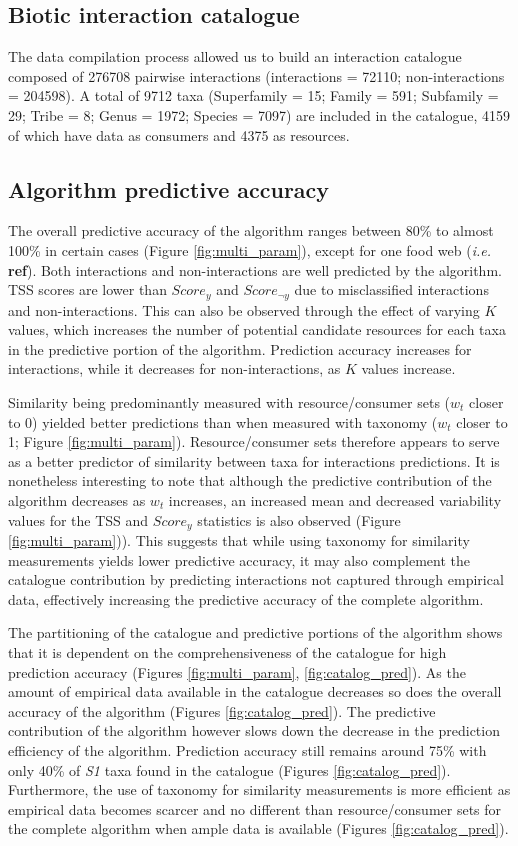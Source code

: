 \documentclass[letterpaper]{article}
\begin{document}
    \subsection{Biotic interaction catalogue}
The data compilation process allowed us to build an interaction catalogue composed of 276708 pairwise interactions (interactions = 72110; non-interactions = 204598). A total of 9712 taxa (Superfamily = 15; Family = 591; Subfamily = 29; Tribe = 8; Genus = 1972; Species = 7097) are included in the catalogue, 4159 of which have data as consumers and 4375 as resources.

    \subsection{Algorithm predictive accuracy}
The overall predictive accuracy of the algorithm ranges between 80\% to almost 100\% in certain cases (Figure \ref{fig:multi_param}), except for one food web (\textit{i.e.} \textbf{ref}). Both interactions and non-interactions are well predicted by the algorithm. TSS scores are lower than $Score_y$ and $Score_{\neg y}$ due to misclassified interactions and non-interactions. This can also be observed through the effect of varying $K$ values, which increases the number of potential candidate resources for each taxa in the predictive portion of the algorithm. Prediction accuracy increases for interactions, while it decreases for non-interactions, as $K$ values increase.

Similarity being predominantly measured with resource/consumer sets ($w_t$ closer to 0) yielded better predictions than when measured with taxonomy ($w_t$ closer to 1; Figure \ref{fig:multi_param}). Resource/consumer sets therefore appears to serve as a better predictor of similarity between taxa for interactions predictions. It is nonetheless interesting to note that although the predictive contribution of the algorithm decreases as $w_t$ increases, an increased mean and decreased variability values for the TSS and $Score_y$ statistics is also observed (Figure \ref{fig:multi_param})). This suggests that while using taxonomy for similarity measurements yields lower predictive accuracy, it may also complement the catalogue contribution by predicting interactions not captured through empirical data, effectively increasing the predictive accuracy of the complete algorithm.

The partitioning of the catalogue and predictive portions of the algorithm shows that it is dependent on the comprehensiveness of the catalogue for high prediction accuracy (Figures \ref{fig:multi_param}, \ref{fig:catalog_pred}). As the amount of empirical data available in the catalogue decreases so does the overall accuracy of the algorithm (Figures \ref{fig:catalog_pred}). The predictive contribution of the algorithm however slows down the decrease in the prediction efficiency of the algorithm. Prediction accuracy still remains around 75\% with only 40\% of \textit{S1} taxa found in the catalogue (Figures \ref{fig:catalog_pred}). Furthermore, the use of taxonomy for similarity measurements is more efficient as empirical data becomes scarcer and no different than resource/consumer sets for the complete algorithm when ample data is available (Figures \ref{fig:catalog_pred}).
\end{document}
